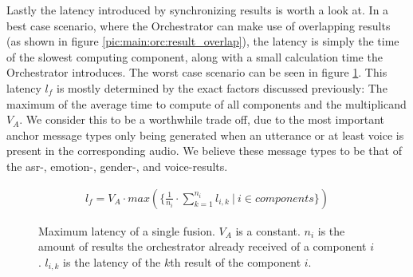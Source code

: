 Lastly the latency introduced by synchronizing results is worth a look at.
In a best case scenario, where the Orchestrator can make use of overlapping results (as shown in figure \ref{pic:main:orc:result_overlap}), the latency is simply the time of the slowest computing component, along with a small calculation time the Orchestrator introduces.
The worst case scenario can be seen in figure \ref{main:orc:latency:formula}.
This latency $l_f$ is mostly determined by the exact factors discussed previously: The maximum of the average time to compute of all components and the multiplicand $V_A$. 
We consider this to be a worthwhile trade off, due to the most important anchor message types only being generated when an utterance or at least voice is present in the corresponding audio.
We believe these message types to be that of the \gls{asr}-, emotion-, gender-, and voice-results.

\begin{figure}
	\begin{align*}
	l_{f} = V_A \cdot max(\{\frac{1}{n_i} \cdot \sum_{k=1}^{n_i} l_{i,k}\ | \ i \in components\})
	\end{align*}
	\caption{Maximum latency of a single fusion.
		$V_A$ is a constant.
		$n_i$ is the amount of results the orchestrator already received of a component $i$.
		$l_{i,k}$ is the latency of the $k$th result of the component $i$.}
	\label{main:orc:latency:formula}
\end{figure}
